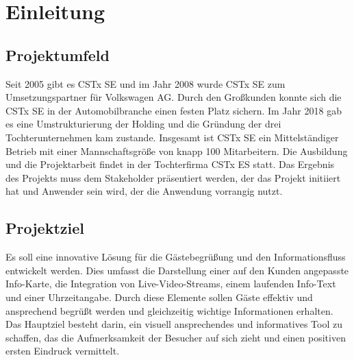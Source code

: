\section{Einleitung}
\label{sec:Einleitung}


\subsection{Projektumfeld} 
\label{sec:Projektumfeld}
Seit 2005 gibt es \ac{CSTx SE} und im Jahr 2008 wurde \ac{CSTx SE} zum Umsetzungspartner für Volkswagen \ac{AG}.
Durch den Großkunden konnte sich die \ac{CSTx SE} in der Automobilbranche einen festen Platz sichern.
Im Jahr 2018 gab es eine Umstrukturierung der Holding und die Gründung der drei Tochterunternehmen kam zustande.
Insgesamt ist \ac{CSTx SE} ein Mittelständiger Betrieb mit einer Mannschaftsgröße von knapp 100 Mitarbeitern.
Die Ausbildung und die Projektarbeit findet in der Tochterfirma \ac{CSTx ES} statt.
Das Ergebnis des Projekts muss dem Stakeholder präsentiert werden, der das Projekt initiiert hat und Anwender sein wird, der die Anwendung vorrangig nutzt.


\subsection{Projektziel} 
\label{sec:Projektziel}
Es soll eine innovative Lösung für die Gästebegrüßung und den Informationsfluss entwickelt werden. 
Dies umfasst die Darstellung einer auf den Kunden angepasste Info-Karte, die Integration von Live-Video-Streams, einem laufenden Info-Text und einer Uhrzeitangabe. 
Durch diese Elemente sollen Gäste effektiv und ansprechend begrüßt werden und gleichzeitig wichtige Informationen erhalten. 
Das Hauptziel besteht darin, ein visuell ansprechendes und informatives Tool zu schaffen, das die Aufmerksamkeit der Besucher auf sich zieht und einen positiven ersten Eindruck vermittelt.


